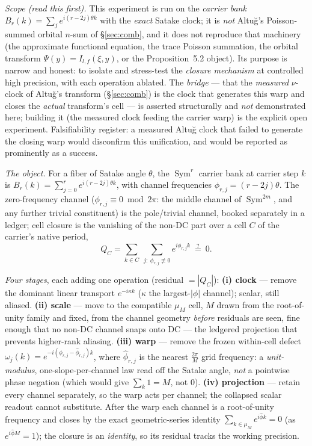 \documentclass[11pt]{article}
\theoremstyle{definition}
\newcommand{\Sym}{\operatorname{Sym}}
\begin{document}
\emph{Scope (read this first).} This experiment is run on the \emph{carrier bank}
$B_r(k)=\sum_j e^{i(r-2j)\theta k}$ with the \emph{exact} Satake clock; it is \emph{not} Altu\u{g}'s
Poisson-summed orbital $n$-sum of \S\ref{sec:comb}, and it does not reproduce that machinery (the approximate
functional equation, the trace Poisson summation, the orbital transform $\Psi(y)=I_{l,f}(\xi,y)$, or the
Proposition~5.2 object). Its purpose is narrow and honest: to isolate and stress-test the \emph{closure
mechanism} at controlled high precision, with each operation ablated. The \emph{bridge} --- that the
\emph{measured} $\nu$-clock of Altu\u{g}'s transform (\S\ref{sec:comb}) is the clock that generates this warp
and closes the \emph{actual} transform's cell --- is asserted structurally and \emph{not} demonstrated here;
building it (the measured clock feeding the carrier warp) is the explicit open experiment. Falsifiability
register: a measured Altu\u{g} clock that failed to generate the closing warp would disconfirm this
unification, and would be reported as prominently as a success.

\emph{The object.} For a fiber of Satake angle $\theta$, the $\Sym^r$ carrier bank at carrier step $k$ is
$B_r(k)=\sum_{j=0}^r e^{i(r-2j)\theta k}$, with channel frequencies $\phi_{r,j}=(r-2j)\theta$. The
zero-frequency channel ($\phi_{r,j}\equiv0\bmod2\pi$: the middle channel of $\Sym^{2m}$, and any further
trivial constituent) is the pole/trivial channel, booked separately in a ledger; cell closure is the vanishing
of the non-DC part over a cell $C$ of the carrier's native period,
\[
  Q_C=\sum_{k\in C}\ \sum_{j:\ \phi_{r,j}\not\equiv0} e^{i\phi_{r,j}k}\ \stackrel{?}{=}\ 0 .
\]

\emph{Four stages}, each adding one operation (residual $=|Q_C|$):
\textbf{(i) clock} --- remove the dominant linear transport $e^{-i\kappa k}$ ($\kappa$ the largest-$|\phi|$
channel); scalar, still aliased.
\textbf{(ii) scale} --- move to the compatible $\mu_M$ cell, $M$ drawn from the root-of-unity family and
fixed, from the channel geometry \emph{before} residuals are seen, fine enough that no non-DC channel snaps
onto DC --- the ledgered projection that prevents higher-rank aliasing.
\textbf{(iii) warp} --- remove the frozen within-cell defect $\omega_j(k)=e^{-i(\phi_{r,j}-\hat\phi_{r,j})k}$,
where $\hat\phi_{r,j}$ is the nearest $\tfrac{2\pi}{M}$ grid frequency: a \emph{unit-modulus},
one-slope-per-channel law read off the Satake angle, \emph{not} a pointwise phase negation (which would give
$\sum_k1=M$, not $0$).
\textbf{(iv) projection} --- retain every channel separately, so the warp acts per channel; the collapsed
scalar readout cannot substitute.
After the warp each channel is a root-of-unity frequency and closes by the exact geometric-series identity
$\sum_{k\in\mu_M}e^{i\hat\phi k}=0$ (as $e^{i\hat\phi M}=1$); the closure is an \emph{identity}, so its residual
tracks the working precision.
\end{document}
